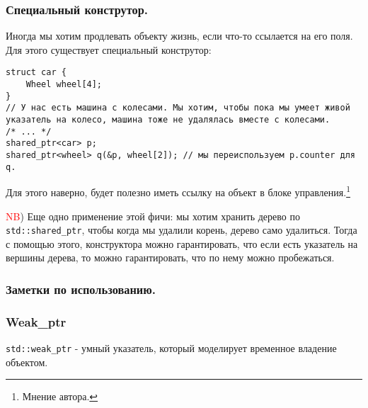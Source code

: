 \subsubsection{Специальный конструтор.}
Иногда мы хотим продлевать объекту жизнь, если что-то ссылается на его поля. Для этого существует специальный конструтор:

\begin{verbatim}
struct car {
    Wheel wheel[4];
}
// У нас есть машина с колесами. Мы хотим, чтобы пока мы умеет живой указатель на колесо, машина тоже не удалялась вместе с колесами.
/* ... */
shared_ptr<car> p;
shared_ptr<wheel> q(&p, wheel[2]); // мы переиспользуем p.counter для q.

\end{verbatim}
Для этого наверно, будет полезно иметь ссылку на объект в блоке управления.\footnote{Мнение автора.}


\textcolor{red}{NB}) Еще одно применение этой фичи: мы хотим хранить дерево по \texttt{std::shared_ptr}, чтобы когда мы удалили корень, дерево само удалиться. Тогда с помощью этого, конструктора можно гарантировать, что если есть указатель на вершины дерева, то можно гарантировать, что по нему можно пробежаться.

\subsubsection{Заметки по использованию.}
\subsubsection{Weak\_ptr}
\texttt{std::weak_ptr} - умный указатель, который моделирует временное владение объектом.


